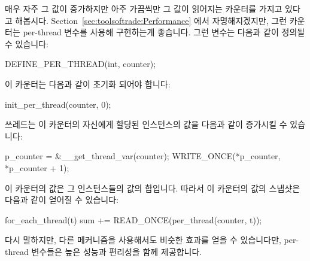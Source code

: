 {{{{매우 자주 그 값이 증가하지만 아주 가끔씩만 그 값이 읽어지는 카운터를 가지고
있다고 해봅시다.
Section~\ref{sec:toolsoftrade:Performance} 에서 자명해지겠지만, 그런 카운터는
per-thread 변수를 사용해 구현하는게 좋습니다.
그런 변수는 다음과 같이 정의될 수 있습니다:

\begin{VerbatimU}
DEFINE_PER_THREAD(int, counter);
\end{VerbatimU}

이 카운터는 다음과 같이 초기화 되어야 합니다:

\begin{VerbatimU}
init_per_thread(counter, 0);
\end{VerbatimU}

쓰레드는 이 카운터의 자신에게 할당된 인스턴스의 값을 다음과 같이 증가시킬 수
있습니다:

\begin{VerbatimU}
p_counter = &__get_thread_var(counter);
WRITE_ONCE(*p_counter, *p_counter + 1);
\end{VerbatimU}

이 카운터의 값은 그 인스턴스들의 값의 합입니다.
따라서 이 카운터의 값의 스냅샷은 다음과 같이 얻어질 수 있습니다:

\begin{VerbatimU}
for_each_thread(t)
  sum += READ_ONCE(per_thread(counter, t));
\end{VerbatimU}

다시 말하지만, 다른 메커니즘을 사용해서도 비슷한 효과를 얻을 수 있습니다만,
per-thread 변수들은 높은 성능과 편리성을 함께 제공합니다.

}}}}
